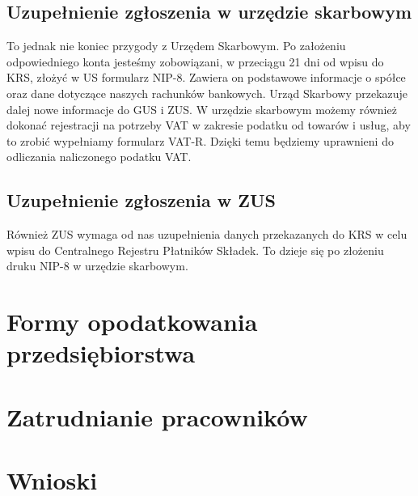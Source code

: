 \documentclass[11pt]{article}
\begin{document}
	\subsection{Uzupełnienie zgłoszenia w urzędzie skarbowym}


To jednak nie koniec przygody z Urzędem Skarbowym. Po założeniu odpowiedniego konta jesteśmy zobowiązani, w przeciągu 21 dni od wpisu do KRS, złożyć w US formularz NIP-8. Zawiera on podstawowe informacje o spółce oraz dane dotyczące naszych rachunków bankowych. Urząd Skarbowy przekazuje dalej nowe informacje do GUS i ZUS. W urzędzie skarbowym możemy również dokonać rejestracji na potrzeby VAT w zakresie podatku od towarów i usług, aby to zrobić wypełniamy formularz VAT-R. Dzięki temu będziemy uprawnieni do odliczania naliczonego podatku VAT.

\subsection{Uzupełnienie zgłoszenia w ZUS}


Również ZUS wymaga od nas uzupełnienia danych przekazanych do KRS w celu wpisu do Centralnego Rejestru Płatników Składek. To dzieje się po złożeniu druku NIP-8 w urzędzie skarbowym.




	
	\section{Formy opodatkowania przedsiębiorstwa}
	
	\section{Zatrudnianie pracowników}
	
	\section{Wnioski}
    
\end{document}
